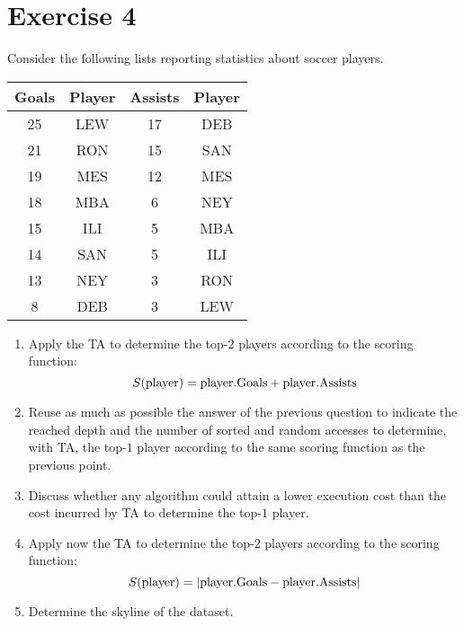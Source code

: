 \section{Exercise 4}

Consider the following lists reporting statistics about soccer players.
\begin{table}[H]
    \centering
    \begin{tabular}{cc|cc}
    \hline
    \textbf{Goals} & \textbf{Player} & \textbf{Assists} & \textbf{Player} \\ \hline
    25             & LEW             & 17               & DEB             \\
    21             & RON             & 15               & SAN             \\
    19             & MES             & 12               & MES             \\
    18             & MBA             & 6                & NEY             \\
    15             & ILI             & 5                & MBA             \\
    14             & SAN             & 5                & ILI             \\
    13             & NEY             & 3                & RON             \\
    8              & DEB             & 3                & LEW             \\ \hline
    \end{tabular}
\end{table}
\begin{enumerate}
    \item Apply the TA to determine the top-$2$ players according to the scoring function: 
        \[S(\textnormal{player})=\textnormal{player.Goals}+\textnormal{player.Assists}\]
    \item Reuse as much as possible the answer of the previous question to indicate the reached depth and the number of sorted and random accesses to determine, with TA, the top-$1$ player according to the same scoring function as the previous point.
    \item Discuss whether any algorithm could attain a lower execution cost than the cost incurred by TA to determine the top-$1$ player. 
    \item Apply now the TA to determine the top-$2$ players according to the scoring function: 
        \[S(\textnormal{player})=\left\lvert \textnormal{player.Goals}-\textnormal{player.Assists} \right\rvert\]
    \item Determine the skyline of the dataset. 
\end{enumerate}

